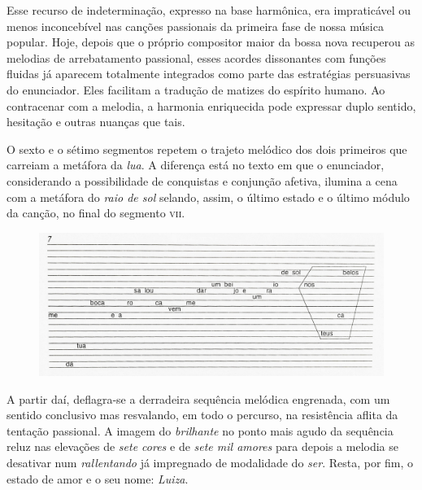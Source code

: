 Esse recurso de indeterminação, expresso na base harmônica, era
impraticável ou menos inconcebível nas canções passionais da primeira
fase de nossa música popular. Hoje, depois que o próprio compositor
maior da bossa nova recuperou as melodias de arrebatamento passional,
esses acordes dissonantes com funções fluidas já aparecem totalmente
integrados como parte das estratégias persuasivas do enunciador. Eles
facilitam a tradução de matizes do espírito humano. Ao contracenar com a
melodia, a harmonia enriquecida pode expressar duplo sentido, hesitação
e outras nuanças que tais.

O sexto e o sétimo segmentos repetem o trajeto melódico dos dois
primeiros que carreiam a metáfora da \textit{lua}. A diferença está no texto
em que o enunciador, considerando a possibilidade de conquistas e
conjunção afetiva, ilumina a cena com a metáfora do \textit{raio de sol}
selando, assim, o último estado e o último módulo da canção, no final do
segmento \textsc{vii}.

\begin{figure}[H]
\includegraphics[width=\textwidth]{./imgs/figura31.jpg}
\end{figure}

A partir daí, deflagra-se a derradeira sequência melódica engrenada, com
um sentido conclusivo mas resvalando, em todo o percurso, na resistência
aflita da tentação passional. A imagem do \textit{brilhante} no ponto mais
agudo da sequência reluz nas elevações de \textit{sete cores} e de \textit{sete mil
amores} para depois a melodia se desativar num \textit{rallentando} já
impregnado de modalidade do \textit{ser}. Resta, por fim, o estado de amor e o
seu nome: \textit{Luiza}.


